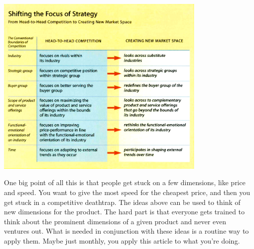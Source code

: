\documentclass[11pt, oneside]{article}   	%
\begin{document}
\begin{center}
\includegraphics[width=4in]{wrapup.png}
\end{center}
One big point of all this is that people get stuck on a few dimensions, like price and speed.  You want to give the most speed for the cheapest price, and then you get stuck in a competitive deathtrap.  The ideas above can be used to think of new dimensions for the product.  The hard part is that everyone gets trained to think about the prominent dimensions of a given product and never even ventures out.  What is needed in conjunction with these ideas is a routine way to apply them.  Maybe just monthly, you apply this article to what you're doing.  
\end{document}

